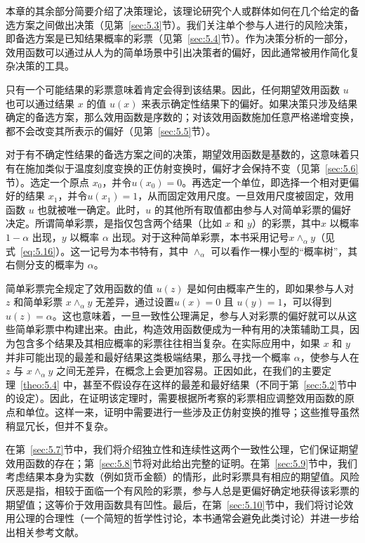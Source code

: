 本章的其余部分简要介绍了决策理论，该理论研究个人或群体如何在几个给定的备选方案之间做出决策（见第~\ref{sec:5.3}节）。我们关注单个参与人进行的风险决策，即备选方案是已知结果概率的彩票（见第~\ref{sec:5.4}节）。作为决策分析的一部分，效用函数可以通过从人为的简单场景中引出决策者的偏好，因此通常被用作简化复杂决策的工具。

只有一个可能结果的彩票意味着肯定会得到该结果。因此，任何期望效用函数 \(u\) 也可以通过结果 \(x\) 的值 \(u\left( x\right)\) 来表示确定性结果下的偏好。如果决策只涉及结果确定的备选方案，那么效用函数是序数的；对该效用函数施加任意严格递增变换，都不会改变其所表示的偏好（见第~\ref{sec:5.5}节）。

对于有不确定性结果的备选方案之间的决策，期望效用函数是基数的，这意味着只有在施加类似于温度刻度变换的正仿射变换时，偏好才会保持不变（见第~\ref{sec:5.6}节）。选定一个原点 \(x_0\)，并令$u(x_0)=0$。再选定一个单位，即选择一个相对更偏好的结果 \(x_1\)，并令$u(x_1)=1$，从而固定效用尺度。一旦效用尺度被固定，效用函数 \(u\) 也就被唯一确定。此时，\(u\) 的其他所有取值都由参与人对简单彩票的偏好决定。所谓简单彩票，是指仅包含两个结果（比如 \(x\) 和 \(y\)）的彩票，其中\(x\) 以概率 \(1-\alpha\) 出现，\(y\) 以概率 \(\alpha\) 出现。对于这种简单彩票，本书采用记号$x \wedge_{\alpha} y$（见式~\eqref{eq:5.16}）。这一记号为本书特有，其中 \(\wedge_{\alpha}\) 可以看作一棵小型的“概率树”，其右侧分支的概率为 \(\alpha\)。

简单彩票完全规定了效用函数的值 \(u\left( z\right)\) 是如何由概率产生的，即如果参与人对 \(z\) 和简单彩票 \(x{ \land  }_{\alpha }y\) 无差异，通过设置\(u\left( x\right)  = 0\) 且 \(u\left( y\right)  = 1\)，可以得到\(u\left( z\right)  = \alpha\)。这也意味着，一旦一致性公理满足，参与人对彩票的偏好就可以从这些简单彩票中构建出来。由此，构造效用函数便成为一种有用的决策辅助工具，因为包含多个结果及其相应概率的彩票往往相当复杂。在实际应用中，如果 \(x\) 和 \(y\) 并非可能出现的最差和最好结果这类极端结果，那么寻找一个概率 \(\alpha\)，使参与人在 \(z\) 与 \(x\wedge_{\alpha}y\) 之间无差异，在概念上会更加容易。正因如此，在我们的主要定理~\ref{theo:5.4} 中，甚至不假设存在这样的最差和最好结果（不同于第~\ref{sec:5.2}节中的设定）。因此，在证明该定理时，需要根据所考察的彩票相应调整效用函数的原点和单位。这样一来，证明中需要进行一些涉及正仿射变换的推导；这些推导虽然稍显冗长，但并不复杂。

在第~\ref{sec:5.7}节中，我们将介绍独立性和连续性这两个一致性公理，它们保证期望效用函数的存在；第~\ref{sec:5.8}节将对此给出完整的证明。在第~\ref{sec:5.9}节中，我们考虑结果本身为实数（例如货币金额）的情形，此时彩票具有相应的期望值。风险厌恶是指，相较于面临一个有风险的彩票，参与人总是更偏好确定地获得该彩票的期望值；这等价于效用函数具有凹性。最后，在第~\ref{sec:5.10}节中，我们将讨论效用公理的合理性（一个简短的哲学性讨论，本书通常会避免此类讨论）并进一步给出相关参考文献。

